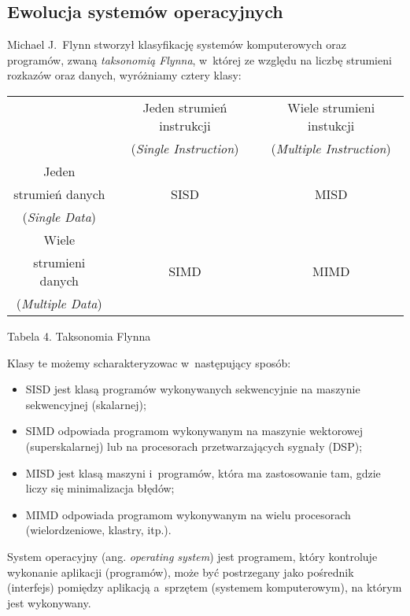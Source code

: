 \documentclass{mwart}
\begin{document}
\subsection{Ewolucja systemów operacyjnych}
%
\indent
	Michael J.~Flynn stworzył klasyfikację systemów komputerowych oraz programów, zwaną \emph{taksonomią Flynna}, w~której ze względu na liczbę
	strumieni rozkazów oraz danych, wyróżniamy cztery klasy:
	\begin{center}
	\begin{tabular}{|c|c|c|} \hline
													 & Jeden strumień instrukcji	 & Wiele strumieni instukcji \\
													 & (\emph{Single Instruction}) & (\emph{Multiple Instruction}) \\\hline
			Jeden                &     												 &      \\
			strumień danych      &  SISD										   & MISD 			\\
			(\emph{Single Data}) &                             & \\\hline
			Wiele                &     												 &      \\
			strumieni danych     & SIMD                        & MIMD \\
			(\emph{Multiple Data}) & 										 & 			\\\hline
	\end{tabular}
	\begin{small} Tabela 4. Taksonomia Flynna \end{small}
	\end{center}
	Klasy te możemy scharakteryzowac w~następujący sposób:
	\begin{itemize}
		\item SISD jest klasą programów wykonywanych sekwencyjnie na maszynie sekwencyjnej (skalarnej);
		\item SIMD odpowiada programom wykonywanym na maszynie wektorowej (superskalarnej) lub na procesorach przetwarzających sygnały (DSP);
		\item MISD jest klasą maszyni i~programów, która ma zastosowanie tam, gdzie liczy się minimalizacja błędów;
		\item MIMD odpowiada programom wykonywanym na wielu procesorach (wielordzeniowe, klastry, itp.).
	\end{itemize}
\par
%
\indent
	System operacyjny (ang. \emph{operating system}) jest programem, który kontroluje wykonanie aplikacji (programów),
	może być postrzegany jako pośrednik (interfejs) pomiędzy aplikacją a~sprzętem (systemem komputerowym), na którym jest wykonywany.
\end{document}
